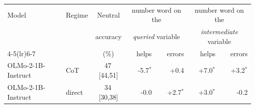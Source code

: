 \begin{tabular}{llcrrrr}
\toprule
Model & Regime & Neutral & \multicolumn{2}{c}{number word on the} & \multicolumn{2}{c}{number word on the} \\
& & accuracy & \multicolumn{2}{c}{\emph{queried} variable} & \multicolumn{2}{c}{\emph{intermediate} variable} \\
\cmidrule(lr){4-5}\cmidrule(lr){6-7}
& & (\%) & helps & errors & helps & errors \\
\midrule
OLMo-2-1B-Instruct & CoT & 47\,{\scriptsize[44,51]} & -5.7$^{*}$ & +0.4 & +7.0$^{*}$ & +3.2$^{*}$ \\
OLMo-2-1B-Instruct & direct & 34\,{\scriptsize[30,38]} & -0.0 & +2.7$^{*}$ & +3.0$^{*}$ & -0.2 \\
\bottomrule
\end{tabular}
